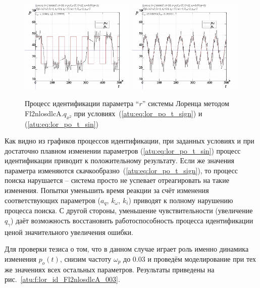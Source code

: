 \begin{figure}[ht!]
  \centerline{
    \includegraphics[width=0.49\textwidth]{p/cha/lor/Fl2nlosdlcA/Fl2nlosdlcA-p_xz_1_wp009.png}
    \hfill
    \includegraphics[width=0.49\textwidth]{p/cha/lor/Fl2nlosdlcA/Fl2nlosdlcA-p_xz_0_wp009.png}
  }
  \caption{Процесс идентификации параметра ``$r$'' системы Лоренца методом Fl2nlosdlcA.$q_{x^2}$ при условиях~(\ref{atu:eq:lor_po_t_sign}) и (\ref{atu:eq:lor_po_t_sin})}
  \label{atu:f:lor_id_Fl2nlosdlcA_wp009}
\end{figure}

Как видно из графиков процессов идентификации,
при заданных условиях и
при достаточно плавном изменении параметров
(\ref{atu:eq:lor_po_t_sin}) процесс идентификации приводит
к положительному результату. Если же значения параметра изменяются
скачкообразно~(\ref{atu:eq:lor_po_t_sign}),
то процесс поиска нарушается -- система просто не успевает
отреагировать на такие изменения. Попытки уменьшить
время реакции за счёт изменения соответствующих
параметров ($a_q$, $k_\omega$, $k_i$) приводят к полному нарушению
процесса поиска. С другой стороны, уменьшение чувствительности
(увеличение $q_\gamma$) даёт возможность восстановить
работоспособность процесса идентификации ценой
значительного увеличения ошибки.

Для проверки тезиса о том, что в данном случае играет роль
именно динамика изменения $p_o(t)$, снизим частоту $\omega_p$ до $0.03$
и проведём моделирование при тех же значениях
всех остальных параметров. Результаты приведены на рис.~\ref{atu:f:lor_id_Fl2nlosdlcA_003}.

